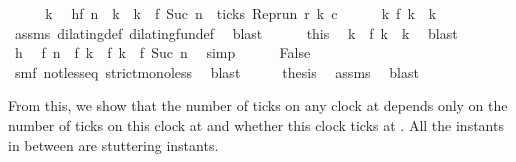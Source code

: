 \begin{isabellebody}
\ \ \isacommand{{\isacharbraceleft}}\isamarkupfalse%
\ \isamarkupfalse%
\ k\ \isamarkupfalse%
\ h{\isacharcolon}{\isacartoucheopen}f\ n\ {\isacharless}\ k\ {\isasymand}\ k\ {\isacharless}\ f\ {\isacharparenleft}Suc\ n{\isacharparenright}\ {\isasymand}\ ticks\ {\isacharparenleft}{\isacharparenleft}Rep{\isacharunderscore}run\ r{\isacharparenright}\ k\ c{\isacharparenright}{\isacartoucheclose}\isanewline
\ \ \ \ \isamarkupfalse%
\ {\isacartoucheopen}{\isasymexists}k\ f\ k\ {\isacharequal}\ k{\isacartoucheclose}\ \isamarkupfalse%
\ assms{\isacharparenleft}{}{\isacharparenright}\ dilating{\isacharunderscore}def\ dilating{\isacharunderscore}fun{\isacharunderscore}def\ \isamarkupfalse%
\ blast\isanewline
\ \ \ \ \isamarkupfalse%
\ this\ \isamarkupfalse%
\ k\ \ {\isacartoucheopen}f\ k\ {\isacharequal}\ k{\isacartoucheclose}\ \isamarkupfalse%
\ blast\isanewline
\ \ \ \ \isamarkupfalse%
\ h\ \isamarkupfalse%
\ {\isacartoucheopen}f\ n\ {\isacharless}\ f\ k\ {\isasymand}\ f\ k\ {\isacharless}\ f\ {\isacharparenleft}Suc\ n{\isacharparenright}{\isacartoucheclose}\ \isamarkupfalse%
\ simp\isanewline
\ \ \ \ \isamarkupfalse%
\ False\ \isamarkupfalse%
\ smf\ not{\isacharunderscore}less{\isacharunderscore}eq\ strict{\isacharunderscore}mono{\isacharunderscore}less\ \isamarkupfalse%
\ blast\isanewline
\ \ \isacommand{{\isacharbraceright}}\isamarkupfalse%
\ \isamarkupfalse%
\ {\isacharquery}thesis\ \isamarkupfalse%
\ assms{\isacharparenleft}{}{\isacharparenright}\ \isamarkupfalse%
\ blast\isanewline
{}\isamarkupfalse%
%
\endisatagproof
{\isafoldproof}%
%
\isadelimproof
%
\endisadelimproof
%
\begin{isamarkuptext}%
From this, we show that the number of ticks on any clock at 
  depends only on the number of ticks on this clock at  and whether
  this clock ticks at .
  All the instants in between are stuttering instants.%
\end{isamarkuptext}\isamarkuptrue%
\isamarkupfalse%

\end{isabellebody}
